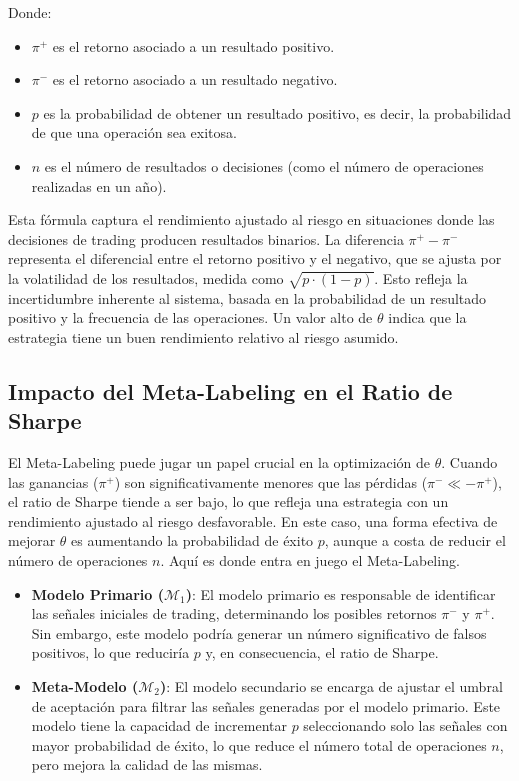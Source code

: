 \documentclass[a4paper,12pt, twoside]{report}
\begin{document}
Donde:
\begin{itemize}
    \item $\pi^+$ es el retorno asociado a un resultado positivo.
    \item $\pi^-$ es el retorno asociado a un resultado negativo.
    \item $p$ es la probabilidad de obtener un resultado positivo, es decir, la 
    probabilidad de que una operación sea exitosa.
    \item $n$ es el número de resultados o decisiones (como el número de 
    operaciones realizadas en un año).
\end{itemize}

Esta fórmula captura el rendimiento ajustado al riesgo en situaciones donde las 
decisiones de trading producen resultados binarios. La diferencia $\pi^+ - \pi^-$ 
representa el diferencial entre el retorno positivo y el negativo, que se ajusta 
por la volatilidad de los resultados, medida como $\sqrt{p \cdot (1 - p)}$. Esto 
refleja la incertidumbre inherente al sistema, basada en la probabilidad de un 
resultado positivo y la frecuencia de las operaciones.
Un valor alto de $\theta$ indica que la estrategia tiene un buen rendimiento 
relativo al riesgo asumido.



\subsection{Impacto del Meta-Labeling en el Ratio de Sharpe}

El Meta-Labeling puede jugar un papel crucial en la optimización de $\theta$. Cuando 
las ganancias ($\pi^+$) son significativamente menores que las pérdidas ($\pi^- \ll -\pi^+$), 
el ratio de Sharpe tiende a ser bajo, lo que refleja una estrategia con un rendimiento 
ajustado al riesgo desfavorable. En este caso, una forma efectiva de 
mejorar $\theta$ es aumentando la probabilidad de éxito $p$, aunque a costa de 
reducir el número de operaciones $n$. Aquí es donde entra en juego el Meta-Labeling.

\begin{itemize}
    \item \textbf{Modelo Primario ($\mathcal{M}_1$)}: El modelo primario es responsable de identificar 
    las señales iniciales de trading, determinando los posibles retornos $\pi^-$ y $\pi^+$. Sin embargo, 
    este modelo podría generar un número significativo de falsos positivos, lo que reduciría $p$ y, en 
    consecuencia, el ratio de Sharpe.
    
    \item \textbf{Meta-Modelo ($\mathcal{M}_2$)}: El modelo secundario se encarga de ajustar el umbral 
    de aceptación para filtrar las señales generadas por el modelo primario. Este modelo tiene la 
    capacidad de incrementar $p$ seleccionando solo las señales con mayor probabilidad de éxito, 
    lo que reduce el número total de operaciones $n$, pero mejora la calidad de las mismas.
\end{itemize}
\end{document}
